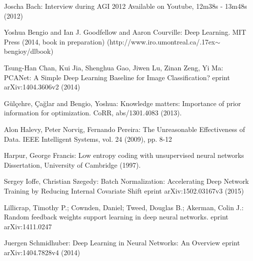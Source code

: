 \documentclass[citeauthoryear]{llncs}
\begin{document}
%
%
\begin{thebibliography}{}
%
\newcommand{\mytilde}{\raise.17ex\hbox{$\scriptstyle\mathtt{\sim}$}}

Joscha Bach:
Interview during AGI 2012
Available on Youtube, 12m38s - 13m48s (2012)

Yoshua Bengio and Ian J. Goodfellow and Aaron Courville:
Deep Learning.
MIT Press (2014, book in preparation)
(http://www.iro.umontreal.ca/\mytilde{}bengioy/dlbook)

Tsung-Han Chan, Kui Jia, Shenghua Gao, Jiwen Lu, Zinan Zeng, Yi Ma:
PCANet: A Simple Deep Learning Baseline for Image Classification?
eprint arXiv:1404.3606v2 (2014)

G{\"u}l{\c{c}}ehre, {\c{C}}a{\u{g}}lar and Bengio, Yoshua:
Knowledge matters: Importance of prior information for optimization.
CoRR, abs/1301.4083 (2013).

Alon Halevy, Peter Norvig, Fernando Pereira:
The Unreasonable Effectiveness of Data.
IEEE Intelligent Systems, vol. 24 (2009), pp. 8-12

Harpur, George Francis: 
Low entropy coding with unsupervised neural networks
Dissertation, University of Cambridge (1997).

Sergey Ioffe, Christian Szegedy:
Batch Normalization: Accelerating Deep Network Training by Reducing Internal Covariate Shift
eprint arXiv:1502.03167v3 (2015)

Lillicrap, Timothy P.; Cownden, Daniel; Tweed, Douglas B.; Akerman, Colin J.:
Random feedback weights support learning in deep neural networks.
eprint arXiv:1411.0247

Juergen Schmidhuber:
Deep Learning in Neural Networks: An Overview
eprint arXiv:1404.7828v4 (2014)

%
%
% 
%

\end{thebibliography}
\end{document}
